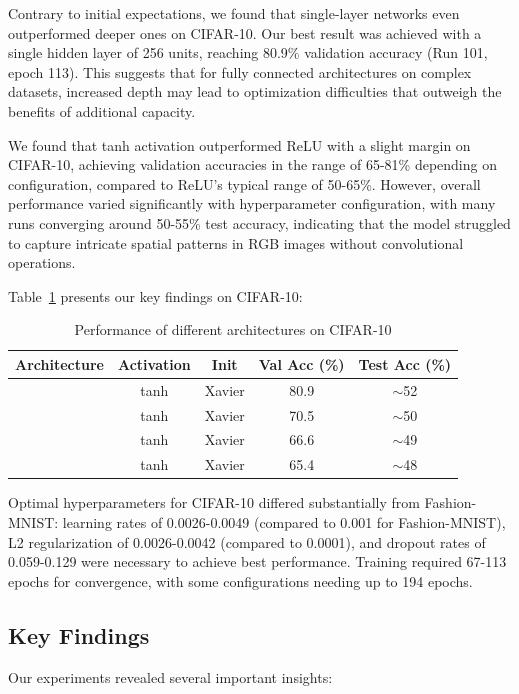 Contrary to initial expectations, we found that single-layer networks even outperformed deeper ones on CIFAR-10. Our best result was achieved with a single hidden layer of 256 units, reaching 80.9\% validation accuracy (Run 101, epoch 113). This suggests that for fully connected architectures on complex datasets, increased depth may lead to optimization difficulties that outweigh the benefits of additional capacity.

We found that tanh activation outperformed ReLU with a slight margin on CIFAR-10, achieving validation accuracies in the range of 65-81\% depending on configuration, compared to ReLU's typical range of 50-65\%. However, overall performance varied significantly with hyperparameter configuration, with many runs converging around 50-55\% test accuracy, indicating that the model struggled to capture intricate spatial patterns in RGB images without convolutional operations.

Table~\ref{tab:cifar10_results} presents our key findings on CIFAR-10:

\begin{table}[htb]
\centering
\caption{Performance of different architectures on CIFAR-10}
\label{tab:cifar10_results}
\begin{tabular}{lcccc}
\hline
Architecture & Activation & Init & Val Acc (\%) & Test Acc (\%) \\
\hline
[256] & tanh & Xavier & 80.9 & $\sim$52 \\
[256, 128] & tanh & Xavier & 70.5 & $\sim$50 \\
[128, 64] & tanh & Xavier & 66.6 & $\sim$49 \\
[512, 256] & tanh & Xavier & 65.4 & $\sim$48 \\
\hline
\end{tabular}
\end{table}

Optimal hyperparameters for CIFAR-10 differed substantially from Fashion-MNIST: learning rates of 0.0026-0.0049 (compared to 0.001 for Fashion-MNIST), L2 regularization of 0.0026-0.0042 (compared to 0.0001), and dropout rates of 0.059-0.129 were necessary to achieve best performance. Training required 67-113 epochs for convergence, with some configurations needing up to 194 epochs.

\subsection{Key Findings}

Our experiments revealed several important insights:


